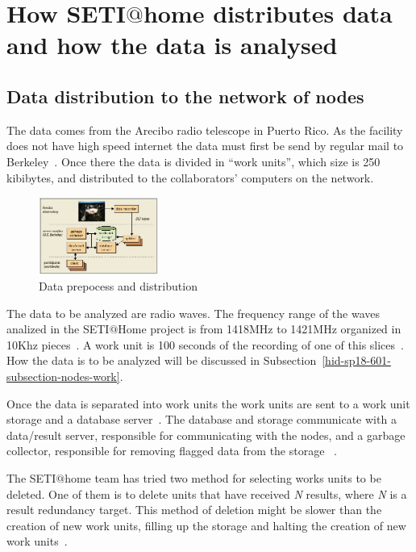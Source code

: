 \section{How SETI$@$home distributes data and how the
data is analysed}\label{hid-sp18-601-section-howworks}
\subsection{Data distribution to the network
of nodes}\label{hid-sp18-601-subsection-data-dist}
The data comes from the Arecibo radio telescope in Puerto Rico. As the facility
does not have high speed internet the data must first be send by regular mail to
 Berkeley~\cite{hid-sp18-601-www-sathome-howworks}. Once there the data is 
 divided in ``work units'', which size is 250 kibibytes, and distributed to the 
 collaborators' computers on the network.

\begin{figure}[!htb]
        \centering
        \includegraphics[width=0.35\textwidth]{figures/arecibo-to-net.jpg}
        \caption{Data prepocess and
        distribution~\cite{hid-sp18-601-paper-anderson2002seti}}\label{datasend}
\end{figure}

The data to be analyzed are radio waves. The frequency range of the waves 
analized in the SETI$@$Home project is from 1418MHz to 1421MHz organized in 
10Khz pieces~\cite{hid-sp18-601-paper-anderson2002seti}. A work unit is 100 
seconds of the recording of one of this 
slices~\cite{hid-sp18-601-www-sathome-howworks}. How the data is to be analyzed 
will be discussed in Subsection~\ref{hid-sp18-601-subsection-nodes-work}.

Once the data is separated into work units the work units are sent to a work 
unit storage and a database server~\cite{hid-sp18-601-book-foster1999carl}. 
The database and storage communicate with a data/result server, responsible for 
communicating with the nodes, and a garbage collector, responsible for 
removing flagged data from the 
storage
~\cite{hid-sp18-601-book-foster1999carl,hid-sp18-601-paper-anderson2002seti}.

The SETI$@$home team has tried two method for selecting works units to be 
deleted. One of them is to delete units that have received \textit{N} results,
where \textit{N} is a result redundancy target. This method of deletion might 
be slower than the creation of new work units, filling up the storage and 
halting the creation of new work 
units~\cite{hid-sp18-601-paper-anderson2002seti}.

